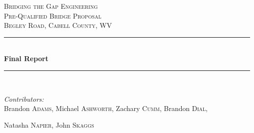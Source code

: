 
\begin{titlepage}
	
	\newcommand{\HRule}{\rule{\linewidth}{0.5mm}} %
	
	\center %
	
	
\textsc{\LARGE Bridging the Gap Engineering}\\[0.5cm] %
\textsc{\Large Pre-Qualified Bridge Proposal}\\[0.5cm] %
\textsc{\large Begley Road, Cabell County, WV}\\[0.5cm]

\HRule \\[0.4cm]
 \huge \bfseries Final Report\\[0.1cm] %
\HRule \\[1.5cm]


\begin{minipage}{1.0\textwidth}
	\begin{flushleft} \large
		
		\emph{Contributors:}\\  %
		Brandon \textsc{Adams},
		Michael \textsc{Ashworth},
		Zachary \textsc{Cumm},
		Brandon \textsc{Dial},		
		\begin{center}
			Natasha \textsc{Napier},
			John \textsc{Skaggs}			
		\end{center}
	\end{flushleft}
\end{minipage}
~


\end{titlepage}
